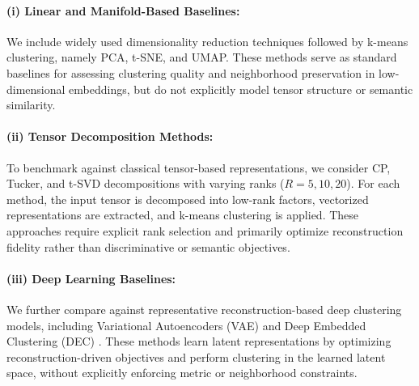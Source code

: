 \documentclass[a4paper,12pt,reqno]{amsart}
\theoremstyle{definition}
\theoremstyle{remark}
\begin{document}
	\paragraph{(i) Linear and Manifold-Based Baselines:}
	We include widely used dimensionality reduction techniques followed by k-means clustering, namely PCA, t-SNE, and UMAP. These methods serve as standard baselines for assessing clustering quality and neighborhood preservation in low-dimensional embeddings, but do not explicitly model tensor structure or semantic similarity.\\
	\paragraph{(ii) Tensor Decomposition Methods:}
	To benchmark against classical tensor-based representations, we consider CP, Tucker, and t-SVD decompositions with varying ranks ($R = 5, 10, 20$). For each method, the input tensor is decomposed into low-rank factors, vectorized representations are extracted, and k-means clustering is applied. These approaches require explicit rank selection and primarily optimize reconstruction fidelity rather than discriminative or semantic objectives.\\
	\paragraph{(iii) Deep Learning Baselines:}
	We further compare against representative reconstruction-based deep clustering models, including Variational Autoencoders (VAE) \cite{kingma2013auto} and Deep Embedded Clustering (DEC) \cite{xie2016unsupervised}. These methods learn latent representations by optimizing reconstruction-driven objectives and perform clustering in the learned latent space, without explicitly enforcing metric or neighborhood constraints.\\
\end{document}
